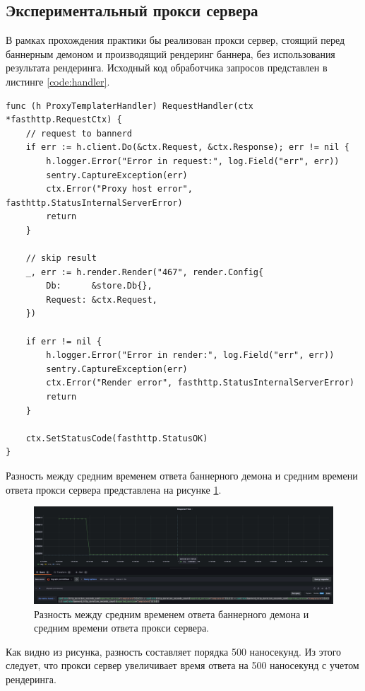 \subsection{Экспериментальный прокси сервера}
В рамках прохождения практики бы реализован прокси сервер, стоящий перед баннерным демоном и производящий рендеринг баннера, без использования результата рендеринга. Исходный код обработчика запросов представлен в листинге \ref{code:handler}.

\begin{lstlisting}[label=code:handler, caption={Обработчик запроса прокси сервер}]
func (h ProxyTemplaterHandler) RequestHandler(ctx *fasthttp.RequestCtx) {
	// request to bannerd
	if err := h.client.Do(&ctx.Request, &ctx.Response); err != nil {
		h.logger.Error("Error in request:", log.Field("err", err))
		sentry.CaptureException(err)
		ctx.Error("Proxy host error", fasthttp.StatusInternalServerError)
		return
	}
	
	// skip result
	_, err := h.render.Render("467", render.Config{
		Db:      &store.Db{},
		Request: &ctx.Request,
	})
	
	if err != nil {
		h.logger.Error("Error in render:", log.Field("err", err))
		sentry.CaptureException(err)
		ctx.Error("Render error", fasthttp.StatusInternalServerError)
		return
	}
	
	ctx.SetStatusCode(fasthttp.StatusOK)
}
\end{lstlisting}

Разность  между средним временем ответа баннерного демона и средним времени ответа прокси сервера представлена на рисунке \ref{fig:metrics}.

\begin{figure}[hbtp]
	\centering
	\includegraphics[width=\textwidth]{inc/metrics}
	\caption{Разность  между средним временем ответа баннерного демона и средним времени ответа прокси сервера.}
	\label{fig:metrics}
\end{figure}

\newpage

Как видно из рисунка, разность составляет порядка 500 наносекунд.  Из этого следует, что прокси сервер увеличивает время ответа на 500 наносекунд с учетом рендеринга.


